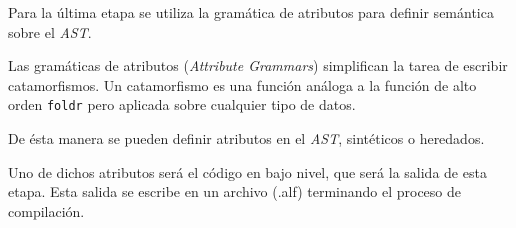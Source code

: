  Para la última etapa se utiliza la gramática de atributos para definir
semántica sobre el \emph{AST}.

  Las gramáticas de atributos (\emph{Attribute Grammars}) simplifican
la tarea de escribir catamorfismos.
Un catamorfismo es una función análoga a la función de alto orden
\texttt{foldr} pero aplicada sobre cualquier tipo de datos.

  De ésta manera se pueden definir atributos en el \emph{AST}, sintéticos
o heredados.

  Uno de dichos atributos será el código en bajo nivel, que será la salida
de esta etapa.
  Esta salida se escribe en un archivo (.alf) terminando el proceso
de compilación.


